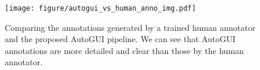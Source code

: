 \begin{figure}[t]
    \centering
    \texttt{[image: figure/autogui\_vs\_human\_anno\_img.pdf]}
    \caption{Comparing the annotations generated by a trained human annotator and the proposed AutoGUI pipeline. We can see that AutoGUI annotations are more detailed and clear than those by the human annotator.}
    \label{fig: autogui vs human}
\end{figure}
